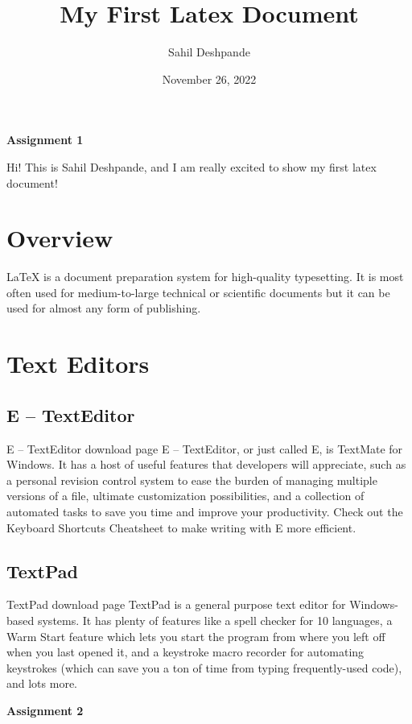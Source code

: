 \documentclass[12pt , a4paper]{article}
\title{My First Latex Document}
\author{Sahil Deshpande}
\date{November 26, 2022}
\begin{document}
\begin{Huge}
\begin{center}
\bf Assignment 1
\end{center}
\end{Huge}
\maketitle
Hi! This is Sahil Deshpande, and I am really excited to show my first latex document!

\section*{Overview}
LaTeX is a document preparation system for high-quality typesetting. It is most often used for medium-to-large technical or scientific documents but it can be used for almost any form of publishing.
\section*{Text Editors}
\subsection*{E – TextEditor}
E – TextEditor download page E – TextEditor, or just called E, is TextMate for Windows. It has a host of useful features that developers will appreciate, such as a personal revision control system to ease the burden of managing multiple versions of a file, ultimate customization possibilities, and a collection of automated tasks to save you time and improve your productivity. Check out the Keyboard Shortcuts Cheatsheet to make writing with E more efficient.
\subsection*{TextPad}
TextPad download page TextPad is a general purpose text editor for Windows-based systems. It has plenty of features like a spell checker for 10 languages, a Warm Start feature which lets you start the program from where you left off when you last opened it, and a keystroke macro recorder for automating keystrokes (which can save you a ton of time from typing frequently-used code), and lots more.

\pagebreak

\begin{Huge}
\begin{center}
\bf Assignment 2
\end{center}
\end{Huge}
\end{document}
